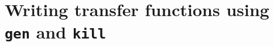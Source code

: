 \documentclass[blockstyle,preprint,nocopyrightspace]{sigplanconf}
\newcommand{\authornote}[1]{{\em #1}}
\newcommand{\john}[1]{\authornote{JD: #1}}
\newcommand\figref[1]{Figure~\ref{fig:#1}}
\begin{document}


\section{Writing transfer functions using \texttt{gen} and \texttt{kill}}
\end{document}
